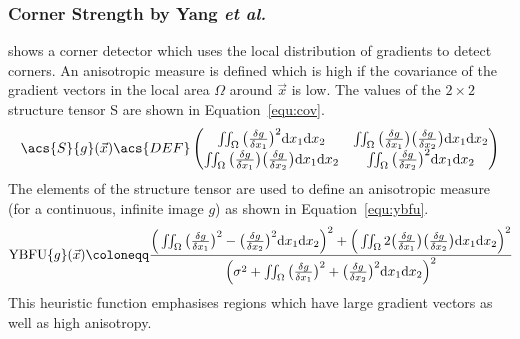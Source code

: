 \documentclass[12pt,a4paper,oneside,openright]{book}
\newcommand{\equ}[1]{Equation~\ref{equ:#1}}
\begin{document}
\begin{CJK}{UTF8}{}
\subsubsection{Corner Strength by Yang \emph{et al.}}
\citet{RefWorks:370} shows a corner detector which uses the local distribution of gradients to detect corners. An anisotropic measure is defined which is high if the covariance of the gradient vectors in the local area $\Omega$ around $\vec{x}$ is low. The values of the $2\times 2$ structure tensor \acs{S} are shown in \equ{cov}.
\begin{equation}\label{equ:cov}
  \acs{S}\{g\}(\vec{x})\acs{DEF}\begin{pmatrix}
    \iint_{\Omega}\big(\frac{\delta g}{\delta x_1}\big)^2
    \mathrm{d}x_1\mathrm{d}x_2 &
    \iint_{\Omega}\big(\frac{\delta g}{\delta x_1}\big)
    \big(\frac{\delta g}{\delta x_2}\big)\mathrm{d}x_1\mathrm{d}x_2\\
    \iint_{\Omega}\big(\frac{\delta g}{\delta x_1}\big)
    \big(\frac{\delta g}{\delta x_2}\big)\mathrm{d}x_1\mathrm{d}x_2 &
    \iint_{\Omega}\big(\frac{\delta g}{\delta x_2}\big)^2
    \mathrm{d}x_1\mathrm{d}x_2
  \end{pmatrix}
\end{equation}
The elements of the structure tensor are used to define an anisotropic measure (for a continuous, infinite image $g$) as shown in \equ{ybfu}.
\begin{equation}\label{equ:ybfu}
  \operatorname{YBFU}\{g\}(\vec{x})\coloneqq
  \cfrac{\Big(\iint_{\Omega}\big(\frac{\delta g}{\delta x_1}\big)^2-
    \big(\frac{\delta g}{\delta x_2}\big)^2\mathrm{d}x_1\mathrm{d}x_2\Big)^2+
    \Big(\iint_{\Omega}2\big(\frac{\delta g}{\delta x_1}\big)
      \big(\frac{\delta g}{\delta x_2}\big)\mathrm{d}x_1\mathrm{d}x_2\Big)^2}
    {\Big(\sigma^2+\iint_{\Omega}\big(\frac{\delta g}{\delta x_1}\big)^2+
    \big(\frac{\delta g}{\delta x_2}\big)^2\mathrm{d}x_1\mathrm{d}x_2\Big)^2}
\end{equation}
This heuristic function emphasises regions which have large gradient vectors as well as high anisotropy.


\end{CJK}
\end{document}

